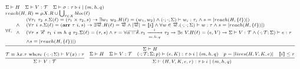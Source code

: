 \documentclass[fleqn]{article}
\begin{document}
\[
\scriptsize
\begin{array}{l}
	\Sigma \vdash H \hspace{1em} \Sigma \vdash V : \mathcal{T} \hspace{1em} \Sigma \vdash \sigma : \tau \triangleright i \mid (m, h, q) \\
	reach(H,R) = \mu X. R \cup \bigcup_{\ell \in X} bloc(\ell) \\
	\infer{\Sigma \vdash H}{\forall \ell, \begin{array}{cl} & (\forall \tau_1~\tau_2~s. \Sigma(\ell) = (\tau_1 \times \tau_2,s) \rightarrow \exists w_1~w_2. H(\ell) = (w_1,w_2) \land (\cdot;\cdot;\Sigma) \vdash w_i : \tau_i \land s = |reach(H,\{\ell\})| ) \\
	\land & (\forall \tau~i~s. \Sigma(\ell)= (\mathbf{arr}~\tau~i,s) \rightarrow \exists \overrightarrow{w}. H(\ell) = \overrightarrow{w} \land |\overrightarrow{w}| = \llbracket i \rrbracket \land \forall w \in \overrightarrow{w}. (\cdot;\cdot;\Sigma) \vdash w : \tau \land s = |reach(H,\{\ell\})| ) \\
	\land & (\forall \tau~s~\overrightarrow{\kappa}~\tau_1~i~m~h~q~\tau_2. \Sigma(\ell)=(\tau,s) \land \tau=\forall \overrightarrow{\alpha::\kappa}. \tau_1 \xrightarrow[m,h,q]{i} \tau_2 \rightarrow \exists e~V. H(\ell) = (e, V) \rightarrow \Sigma \vdash V : \mathcal{T} \land (\cdot;\mathcal{T};\Sigma) \vdash e : \tau \\ & \land s=|reach(H,\{\ell\})|  ) \end{array} } \\
	\infer{\Sigma \vdash V : \mathcal{T}}{\mathcal{T} = \lambda x. \tau \mathrm{~where~} (\cdot;\cdot;\Sigma) \vdash V(x) : \tau   } \hspace{1em}
	\infer{\Sigma \vdash (H,V,K,e,r) : \tau \triangleright i \mid (m , h,q)}{\Sigma \vdash H & \Sigma \vdash V : \mathcal{T} & (\cdot;\mathcal{T};\Sigma;p) \vdash (e,K) : \tau \triangleright i \mid (m,h,q) & p = |lives(H,V,K,e)| & \llbracket i \rrbracket \le r }
\end{array}
\]
\end{document}
